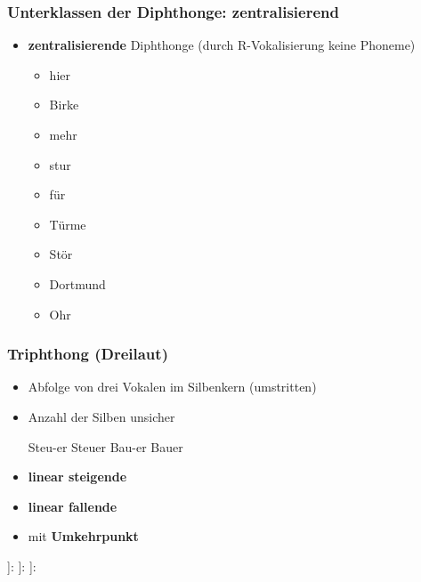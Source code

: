 \begin{frame}
\frametitle{Unterklassen der Diphthonge: zentralisierend}

	\begin{itemize}
		\item \textbf{zentralisierende} Diphthonge (durch R-Vokalisierung \ras keine Phoneme)

		\ea 
		\begin{itemize}
			\item {} \ras hier
			\item {} \ras Birke
			\item {} \ras mehr
			\item {} \ras stur
			\item {} \ras für
			\item {} \ras Türme
			\item {} \ras Stör
			\item {} \ras Dortmund
			\item {} \ras Ohr
		\end{itemize}
		\z
		
	\end{itemize}

\end{frame}


\begin{frame}
\frametitle{Triphthong (Dreilaut)}
	
	\begin{itemize}
		\item Abfolge von drei Vokalen im Silbenkern (umstritten)
			\item Anzahl der Silben unsicher

\pause 
			
			\ea Steu-er \vs Steuer
			\ex Bau-er \vs Bauer
			\z

\pause
			
			\item \textbf{linear steigende}
			\item \textbf{linear fallende}
			\item mit \textbf{Umkehrpunkt}
	\end{itemize}
	
	\ea {[}]: 
	\ex {[}]: 
	\ex {[}]: 
	\z	

\end{frame}


